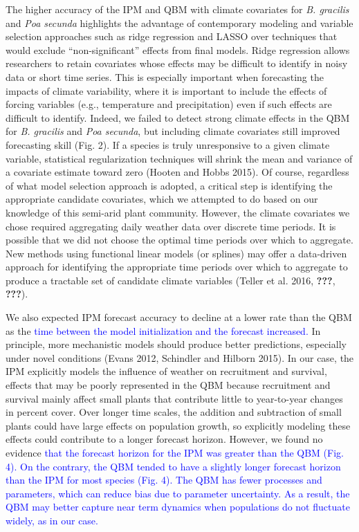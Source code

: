 \documentclass[12pt,]{article}
\begin{document}
The higher accuracy of the IPM and QBM with climate covariates for
\emph{B. gracilis} and \emph{Poa secunda} highlights the advantage of
contemporary modeling and variable selection approaches such as ridge
regression and LASSO over techniques that would exclude
``non-significant'' effects from final models. Ridge regression allows
researchers to retain covariates whose effects may be difficult to
identify in noisy data or short time series. This is especially
important when forecasting the impacts of climate variability, where it
is important to include the effects of forcing variables (e.g.,
temperature and precipitation) even if such effects are difficult to
identify. Indeed, we failed to detect strong climate effects in the QBM
for \emph{B. gracilis} and \emph{Poa secunda}, but including climate
covariates still improved forecasting skill (Fig. 2). If a species is
truly unresponsive to a given climate variable, statistical
regularization techniques will shrink the mean and variance of a
covariate estimate toward zero (Hooten and Hobbs 2015). Of course,
regardless of what model selection approach is adopted, a critical step
is identifying the appropriate candidate covariates, which we attempted
to do based on our knowledge of this semi-arid plant community. However,
the climate covariates we chose required aggregating daily weather data
over discrete time periods. It is possible that we did not choose the
optimal time periods over which to aggregate. New methods using
functional linear models (or splines) may offer a data-driven approach
for identifying the appropriate time periods over which to aggregate to
produce a tractable set of candidate climate variables (Teller et al.
2016, {\textbf{???}}, {\textbf{???}}).

We also expected IPM forecast accuracy to decline at a lower rate than
the QBM as the
\textcolor{blue}{time between the model initialization and the forecast increased.}
In principle, more mechanistic models should produce better predictions,
especially under novel conditions (Evans 2012, Schindler and Hilborn
2015). In our case, the IPM explicitly models the influence of weather
on recruitment and survival, effects that may be poorly represented in
the QBM because recruitment and survival mainly affect small plants that
contribute little to year-to-year changes in percent cover. Over longer
time scales, the addition and subtraction of small plants could have
large effects on population growth, so explicitly modeling these effects
could contribute to a longer forecast horizon. However, we found no
evidence
\textcolor{blue}{that the forecast horizon for the IPM was greater than the QBM (Fig. 4).
On the contrary, the QBM tended to have a slightly longer forecast horizon than the IPM for most species (Fig. 4).
The QBM has fewer processes and parameters, which can reduce bias due to parameter uncertainty.
As a result, the QBM may better capture near term dynamics when populations do not fluctuate widely, as in our case.}
\end{document}

